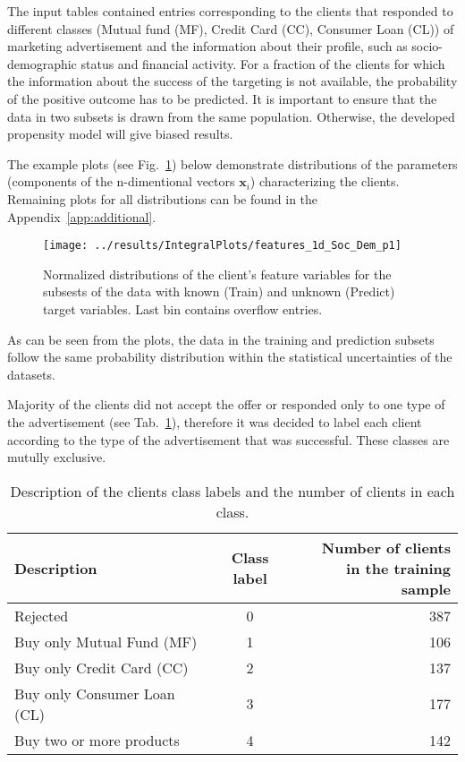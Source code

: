 \documentclass[14pt]{scrartcl}
\begin{document}
The input tables contained entries corresponding to the clients that responded to 
different classes (Mutual fund (MF), Credit Card (CC), Consumer Loan (CL)) of 
marketing advertisement and the information about their profile, such as 
socio-demographic status and financial activity. For a fraction of the clients 
for which the information about the success of the targeting is not available, the
probability of the positive outcome has to be predicted. It is important to ensure
that the data in two subsets is drawn from the same population. Otherwise, the
developed propensity model will give biased results.

The example plots (see Fig.~\ref{fig:inclus_features_1d_Soc_Dem_p1}) below demonstrate 
distributions of the parameters 
(components of the n-dimentional vectors $\textbf{x}_i$) characterizing the clients.
Remaining plots for all distributions can be found in the Appendix~\ref{app:additional}.
\begin{figure}[h!]
    \texttt{[image: ../results/IntegralPlots/features\_1d\_Soc\_Dem\_p1]}\\
    \caption{Normalized distributions of the client's feature variables for the subsests of the
    data with known (Train) and unknown (Predict) target variables. Last bin contains
    overflow entries.}
    \label{fig:inclus_features_1d_Soc_Dem_p1}
\end{figure}
As can be seen from the plots, the data in the training and prediction subsets follow
the same probability distribution within the statistical uncertainties of the datasets.

Majority of the clients did not accept the offer or responded only to one type of 
the advertisement (see Tab.~\ref{tab:clients_per_class}), therefore it was decided to 
label each client according to the type of the advertisement that was successful.
These classes are mutully exclusive.

\begin{table}[htpb!]
    \centering
    \begin{tabular}{ l c | r }
        Description & Class label & \thead{Number of clients \\ in the training sample} \\
        \hline
        Rejected & 0 & 387 \\
        Buy only Mutual Fund (MF) & 1 & 106 \\
        Buy only Credit Card (CC) & 2 & 137 \\
        Buy only Consumer Loan (CL) & 3 & 177 \\
        Buy two or more products & 4 & 142\\
    \end{tabular}
    \caption{Description of the clients class labels and the number of clients in 
    each class.}\label{tab:clients_per_class}
\end{table}
\end{document}
